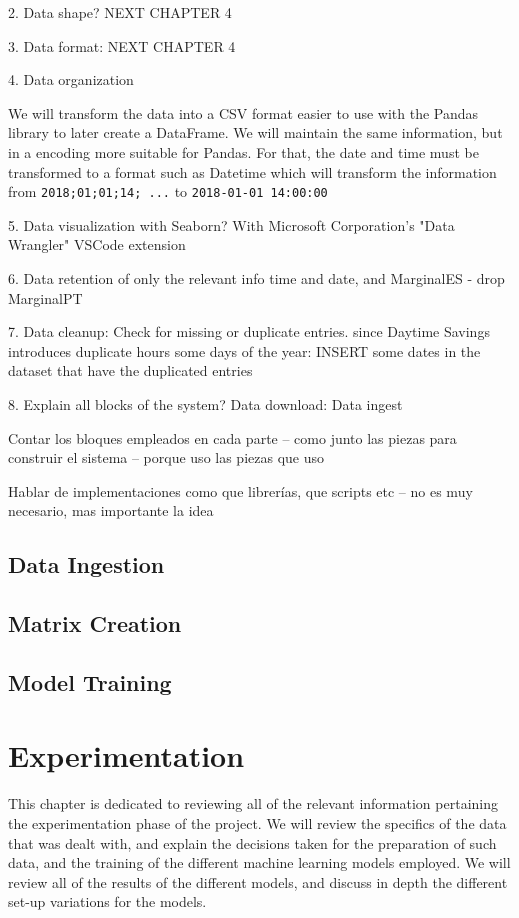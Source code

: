 \documentclass[12pt]{report} %
\begin{document}
2. Data shape? NEXT CHAPTER 4

3. Data format: NEXT CHAPTER 4

4. Data organization

We will transform the data into a CSV format easier to use with the Pandas library to later create a DataFrame. We will maintain the same information, but in a encoding more suitable for Pandas. For that, the date and time must be transformed to a format such as Datetime which will transform the information from \texttt{2018;01;01;14; ...} to \texttt{2018-01-01 14:00:00}

5. Data visualization with Seaborn? With Microsoft Corporation's "Data Wrangler" VSCode extension

6. Data retention of only the relevant info time and date, and MarginalES - drop MarginalPT

7. Data cleanup:
Check for missing or duplicate entries. since Daytime Savings introduces duplicate hours some days of the year:
INSERT some dates in the dataset that have the duplicated entries

8. Explain all blocks of the system?
    Data download:
    Data ingest

Contar los bloques empleados en cada parte – como junto las piezas para construir el sistema – porque uso las piezas que uso

Hablar de implementaciones como que librerías, que scripts etc – no es muy necesario, mas importante la idea

\section{Data Ingestion}

\section{Matrix Creation}

\section{Model Training}




\chapter{Experimentation}
This chapter is dedicated to reviewing all of the relevant information pertaining the experimentation phase of the project. We will review the specifics of the data that was dealt with, and explain the decisions taken for the preparation of such data, and the training of the different machine learning models employed. We will review all of the results of the different models, and discuss in depth the different set-up variations for the models.
\end{document}
